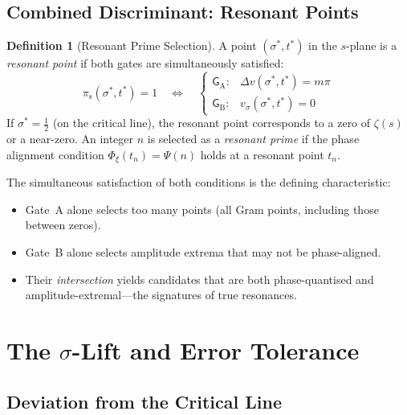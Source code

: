 \documentclass[11pt, a4paper]{article}
\theoremstyle{definition}
\newtheorem{definition}{Definition}[section]
\theoremstyle{plain}
\newcommand{\Phiz}{\Phi_\xi}               %
\newcommand{\Psip}{\Psi}                    %
\newcommand{\pis}{\pi_{\mathrm{s}}}        %
\newcommand{\GateA}{\mathsf{G}_{\mathrm{A}}}
\newcommand{\GateB}{\mathsf{G}_{\mathrm{B}}}
\begin{document}
\subsection{Combined Discriminant: Resonant Points}

\begin{definition}[Resonant Prime Selection]
\label{def:resonant_prime}
A point $(\sigma^*, t^*)$ in the $s$-plane is a \textit{resonant point}
if both gates are simultaneously satisfied:
\begin{equation}
\boxed{
  \pis(\sigma^*, t^*) = 1 \quad\iff\quad
  \begin{cases}
    \GateA: & \Delta v(\sigma^*, t^*) = m\pi \\
    \GateB: & v_\sigma(\sigma^*, t^*) = 0
  \end{cases}
}
\label{eq:discriminant}
\end{equation}
If $\sigma^* = \tfrac{1}{2}$ (on the critical line), the resonant point
corresponds to a zero of $\zeta(s)$ or a near-zero. An integer $n$ is
selected as a \textit{resonant prime} if the phase alignment condition
$\Phiz(t_n) = \Psip(n)$ holds at a resonant point $t_n$.
\end{definition}

The simultaneous satisfaction of both conditions is the defining
characteristic:
\begin{itemize}
  \item Gate~A alone selects too many points (all Gram points, including
        those between zeros).
  \item Gate~B alone selects amplitude extrema that may not be
        phase-aligned.
  \item Their \textit{intersection} yields candidates that are both
        phase-quantised and amplitude-extremal---the signatures of
        true resonances.
\end{itemize}


\section{The $\sigma$-Lift and Error Tolerance}
\label{sec:sigma_lift}

\subsection{Deviation from the Critical Line}
\end{document}
